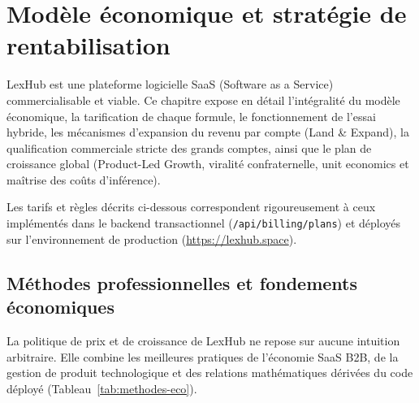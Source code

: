 \chapter{Modèle économique et stratégie de rentabilisation}
\label{ch:economie}

LexHub est une plateforme logicielle SaaS (Software as a Service) commercialisable et viable. Ce chapitre expose en détail l'intégralité du modèle économique, la tarification de chaque formule, le fonctionnement de l'essai hybride, les mécanismes d'expansion du revenu par compte (Land \& Expand), la qualification commerciale stricte des grands comptes, ainsi que le plan de croissance global (Product-Led Growth, viralité confraternelle, unit economics et maîtrise des coûts d'inférence). 

Les tarifs et règles décrits ci-dessous correspondent rigoureusement à ceux implémentés dans le backend transactionnel (\texttt{/api/billing/plans}) et déployés sur l'environnement de production (\url{https://lexhub.space}).

\section{Méthodes professionnelles et fondements économiques}
\label{sec:methodes-eco}

La politique de prix et de croissance de LexHub ne repose sur aucune intuition arbitraire. Elle combine les meilleures pratiques de l'économie SaaS B2B, de la gestion de produit technologique et des relations mathématiques dérivées du code déployé (Tableau~\ref{tab:methodes-eco}).


